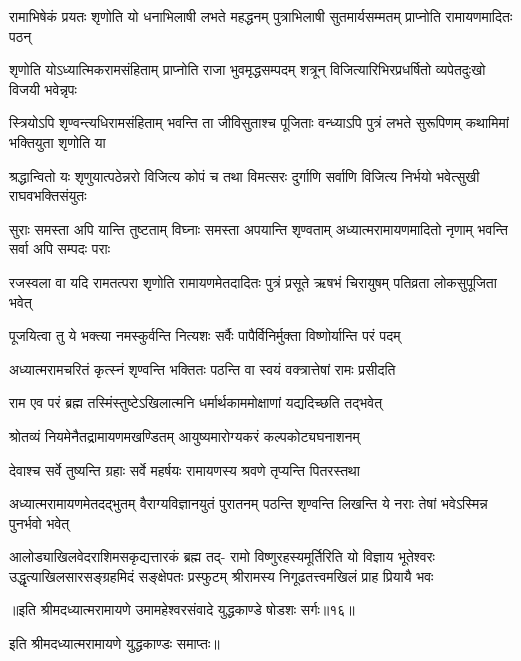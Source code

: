 \fourlineindentedshloka
{रामाभिषेकं प्रयतः शृणोति यो}
{धनाभिलाषी लभते महद्धनम्}
{पुत्राभिलाषी सुतमार्यसम्मतम्}
{प्राप्नोति रामायणमादितः पठन्} %

\fourlineindentedshloka
{शृणोति योऽध्यात्मिकरामसंहिताम्}
{प्राप्नोति राजा भुवमृद्धसम्पदम्}
{शत्रून् विजित्यारिभिरप्रधर्षितो}
{व्यपेतदुःखो विजयी भवेन्नृपः} %

\fourlineindentedshloka
{स्त्रियोऽपि शृण्वन्त्यधिरामसंहिताम्}
{भवन्ति ता जीविसुताश्च पूजिताः}
{वन्ध्याऽपि पुत्रं लभते सुरूपिणम्}
{कथामिमां भक्तियुता शृणोति या} %

\fourlineindentedshloka
{श्रद्धान्वितो यः शृणुयात्पठेन्नरो}
{विजित्य कोपं च तथा विमत्सरः}
{दुर्गाणि सर्वाणि विजित्य निर्भयो}
{भवेत्सुखी राघवभक्तिसंयुतः} %

\fourlineindentedshloka
{सुराः समस्ता अपि यान्ति तुष्टताम्}
{विघ्नाः समस्ता अपयान्ति शृण्वताम्}
{अध्यात्मरामायणमादितो नृणाम्}
{भवन्ति सर्वा अपि सम्पदः पराः} %

\fourlineindentedshloka
{रजस्वला वा यदि रामतत्परा}
{शृणोति रामायणमेतदादितः}
{पुत्रं प्रसूते ऋषभं चिरायुषम्}
{पतिव्रता लोकसुपूजिता भवेत्} %

\twolineshloka
{पूजयित्वा तु ये भक्त्या नमस्कुर्वन्ति नित्यशः}
{सर्वैः पापैर्विनिर्मुक्ता विष्णोर्यान्ति परं पदम्} %

\twolineshloka
{अध्यात्मरामचरितं कृत्स्नं शृण्वन्ति भक्तितः}
{पठन्ति वा स्वयं वक्त्रात्तेषां रामः प्रसीदति} %

\twolineshloka
{राम एव परं ब्रह्म तस्मिंस्तुष्टेऽखिलात्मनि}
{धर्मार्थकाममोक्षाणां यद्यदिच्छति तद्भवेत्} %

\twolineshloka
{श्रोतव्यं नियमेनैतद्रामायणमखण्डितम्}
{आयुष्यमारोग्यकरं कल्पकोट्यघनाशनम्} %

\twolineshloka
{देवाश्च सर्वे तुष्यन्ति ग्रहाः सर्वे महर्षयः}
{रामायणस्य श्रवणे तृप्यन्ति पितरस्तथा} %

\fourlineindentedshloka
{अध्यात्मरामायणमेतदद्भुतम्}
{वैराग्यविज्ञानयुतं पुरातनम्}
{पठन्ति शृण्वन्ति लिखन्ति ये नराः}
{तेषां भवेऽस्मिन्न पुनर्भवो भवेत्} %

\fourlineindentedshloka
{आलोड्याखिलवेदराशिमसकृद्यत्तारकं ब्रह्म तद्-}
{रामो विष्णुरहस्यमूर्तिरिति यो विज्ञाय भूतेश्वरः}
{उद्धृत्याखिलसारसङ्ग्रहमिदं सङ्क्षेपतः प्रस्फुटम्}
{श्रीरामस्य निगूढतत्त्वमखिलं प्राह प्रियायै भवः} %

{॥इति श्रीमदध्यात्मरामायणे उमामहेश्वरसंवादे युद्धकाण्डे षोडशः
सर्गः॥१६॥
}

इति श्रीमदध्यात्मरामायणे युद्धकाण्डः समाप्तः॥